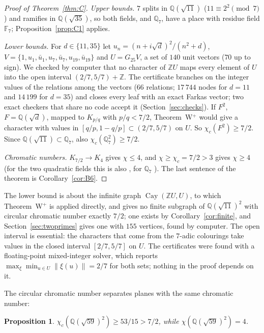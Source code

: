\documentclass[11pt,a4paper]{amsart}
\newtheorem{proposition}{Proposition}
\theoremstyle{remark}
\newcommand{\Q}{\mathbb{Q}}
\newcommand{\Z}{\mathbb{Z}}
\newcommand{\F}{\mathbb{F}}
\newcommand{\Cay}{\operatorname{Cay}}
\begin{document}
\begin{proof}[Proof of Theorem~\ref{thm:C}]
\emph{Upper bounds.} $7$ splits in $\Q(\sqrt{11})$ ($11\equiv2^2\pmod7$) and ramifies in $\Q(\sqrt{35})$, so both
fields, and $\Q_7$, have a place with residue field $\F_7$; Proposition~\ref{prop:C1} applies.

\emph{Lower bounds.} For $d\in\{11,35\}$ let $u_n=(n+i\sqrt d)^2/(n^2+d)$, $V=\{1,u_1,\bar u_1,u_7,\bar u_7,u_{19},\bar
u_{19}\}$ and $U=G_{25}V$, a set of $140$ unit vectors ($70$ up to sign). We checked by computer that no character of
$\Z U$ maps every element of $U$ into the open interval $(2/7,5/7)+\Z$. The certificate branches on the integer
values of the relations among the vectors ($66$ relations; $17\,744$ nodes for $d=11$ and $14\,199$ for $d=35$) and
closes every leaf with an exact Farkas vector; two exact checkers that share no code accept it
(Section~\ref{sec:checks}). If $F^2$, $F=\Q(\sqrt d)$, mapped to $K_{p/q}$ with $p/q<7/2$, Theorem~W$^+$ would
give a character with values in $[q/p,1-q/p]\subset(2/7,5/7)$ on $U$. So $\chi_c(F^2)\ge7/2$. Since
$\Q(\sqrt{11})\subset\Q_7$, also $\chi_c(\Q_7^2)\ge7/2$.

\emph{Chromatic numbers.} $K_{7/2}\to K_4$ gives $\chi\le4$, and $\chi\ge\chi_c=7/2>3$ gives $\chi\ge4$ (for the two
quadratic fields this is also \cite[Theorem~1]{FC}, for $\Q_7$ \cite[Theorem~2]{PP}). The last sentence of the
theorem is Corollary~\ref{cor:B6}.
\end{proof}

The lower bound is about the infinite graph $\Cay(\Z U,U)$, to which Theorem~W$^+$ is applied directly, and gives no
finite subgraph of $\Q(\sqrt{11})^2$ with circular chromatic number exactly $7/2$; one exists by
Corollary~\ref{cor:finite}, and Section~\ref{sec:twoprimes} gives one with $155$ vertices, found by computer. The
open interval is essential:
the characters that come from the $7$-adic colourings take values in the closed interval $[2/7,5/7]$ on $U$. The
certificates were found with a floating-point mixed-integer solver, which reports
$\max_\xi\min_{u\in U}\|\xi(u)\|=2/7$ for both sets; nothing in the proof depends on it.

The circular chromatic number separates planes with the same chromatic number:

\begin{proposition}\label{prop:fiftynine}
$\chi_c(\Q(\sqrt{59})^2)\ge53/15>7/2$, while $\chi(\Q(\sqrt{59})^2)=4$.
\end{proposition}
\end{document}
